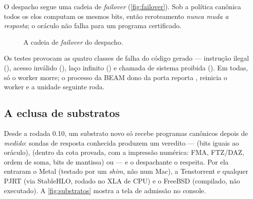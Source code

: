 O despacho segue uma cadeia de \textit{failover} (\autoref{fig:failover}). Sob a política canônica todos os elos computam os mesmos bits, então reroteamento \emph{nunca muda a resposta}; o oráculo não falha para um programa certificado.

\begin{figure}[htbp]
\centering
{}
\caption{A cadeia de \textit{failover} do despacho.}
\label{fig:failover}
\end{figure}

Os testes provocam as quatro classes de falha do código gerado --- instrução ilegal (), acesso inválido (), laço infinito () e chamada de sistema proibida (). Em todas, só o worker morre; o processo da BEAM dono da porta reporta , reinicia o worker e a unidade seguinte roda.

\subsection{A eclusa de substratos}

Desde a rodada 0.10, um substrato novo só recebe programas canônicos depois de \emph{medido}: sondas de resposta conhecida produzem um veredito ---  (bits iguais ao oráculo),  (dentro da cota provada, com a impressão numérica: FMA, FTZ/DAZ, ordem de soma, bits de mantissa) ou  --- e o despachante o respeita. Por ela entraram o Metal (testado por um \textit{shim}, não num Mac), a Tenstorrent e qualquer PJRT (via StableHLO, rodado no XLA de CPU) e o FreeBSD (compilado, não executado). A \autoref{fig:substratos} mostra a tela de admissão no console.

